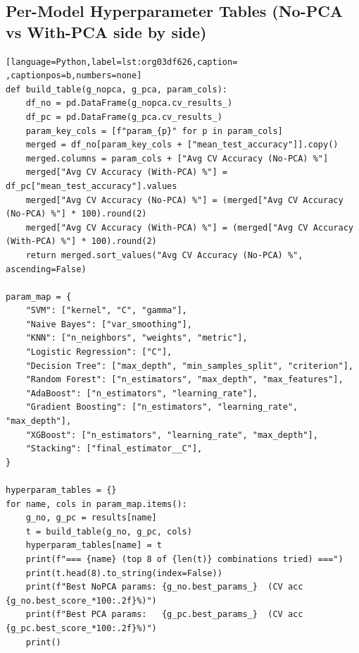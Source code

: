 \documentclass[12pt,a4paper]{article}
\begin{document}
\subsection{Per-Model Hyperparameter Tables (No-PCA vs With-PCA side by side)}
\label{sec:orgc3e2e38}

\begin{lstlisting}[language=Python,label=lst:org03df626,caption= ,captionpos=b,numbers=none]
def build_table(g_nopca, g_pca, param_cols):
    df_no = pd.DataFrame(g_nopca.cv_results_)
    df_pc = pd.DataFrame(g_pca.cv_results_)
    param_key_cols = [f"param_{p}" for p in param_cols]
    merged = df_no[param_key_cols + ["mean_test_accuracy"]].copy()
    merged.columns = param_cols + ["Avg CV Accuracy (No-PCA) %"]
    merged["Avg CV Accuracy (With-PCA) %"] = df_pc["mean_test_accuracy"].values
    merged["Avg CV Accuracy (No-PCA) %"] = (merged["Avg CV Accuracy (No-PCA) %"] * 100).round(2)
    merged["Avg CV Accuracy (With-PCA) %"] = (merged["Avg CV Accuracy (With-PCA) %"] * 100).round(2)
    return merged.sort_values("Avg CV Accuracy (No-PCA) %", ascending=False)

param_map = {
    "SVM": ["kernel", "C", "gamma"],
    "Naive Bayes": ["var_smoothing"],
    "KNN": ["n_neighbors", "weights", "metric"],
    "Logistic Regression": ["C"],
    "Decision Tree": ["max_depth", "min_samples_split", "criterion"],
    "Random Forest": ["n_estimators", "max_depth", "max_features"],
    "AdaBoost": ["n_estimators", "learning_rate"],
    "Gradient Boosting": ["n_estimators", "learning_rate", "max_depth"],
    "XGBoost": ["n_estimators", "learning_rate", "max_depth"],
    "Stacking": ["final_estimator__C"],
}

hyperparam_tables = {}
for name, cols in param_map.items():
    g_no, g_pc = results[name]
    t = build_table(g_no, g_pc, cols)
    hyperparam_tables[name] = t
    print(f"=== {name} (top 8 of {len(t)} combinations tried) ===")
    print(t.head(8).to_string(index=False))
    print(f"Best NoPCA params: {g_no.best_params_}  (CV acc {g_no.best_score_*100:.2f}%)")
    print(f"Best PCA params:   {g_pc.best_params_}  (CV acc {g_pc.best_score_*100:.2f}%)")
    print()
\end{lstlisting}
\end{document}
